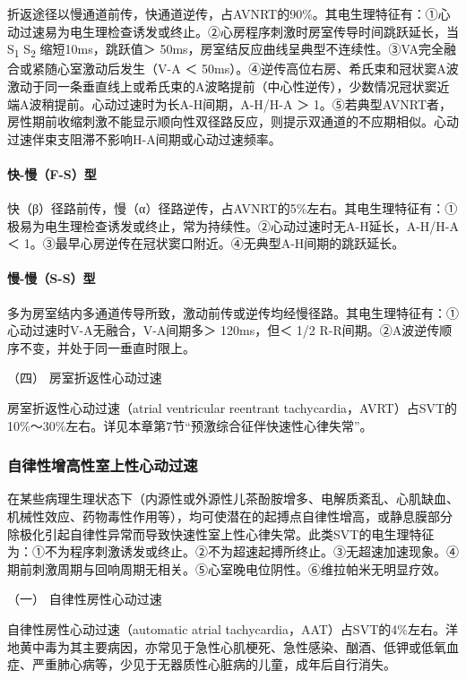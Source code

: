 折返途径以慢通道前传，快通道逆传，占AVNRT的90\%。其电生理特征有：①心动过速易为电生理检查诱发或终止。②心房程序刺激时房室传导时间跳跃延长，当S\textsubscript{1}
S\textsubscript{2} 缩短10ms，跳跃值＞
50ms，房室结反应曲线呈典型不连续性。③VA完全融合或紧随心室激动后发生（V-A
＜
50ms）。④逆传高位右房、希氏束和冠状窦A波激动于同一条垂直线上或希氏束的A波略提前（中心性逆传），少数情况冠状窦近端A波稍提前。心动过速时为长A-H间期，A-H/H-A
＞
1。⑤若典型AVNRT者，房性期前收缩刺激不能显示顺向性双径路反应，则提示双通道的不应期相似。心动过速伴束支阻滞不影响H-A间期或心动过速频率。

\paragraph{快-慢（F-S）型}

快（β）径路前传，慢（α）径路逆传，占AVNRT的5\%左右。其电生理特征有：①极易为电生理检查诱发或终止，常为持续性。②心动过速时无A-H延长，A-H/H-A
＜ 1。③最早心房逆传在冠状窦口附近。④无典型A-H间期的跳跃延长。

\paragraph{慢-慢（S-S）型}

多为房室结内多通道传导所致，激动前传或逆传均经慢径路。其电生理特征有：①心动过速时V-A无融合，V-A间期多＞
120ms，但＜ 1/2 R-R间期。②A波逆传顺序不变，并处于同一垂直时限上。

\hypertarget{text00289.htmlux5cux23CHP10-2-2-1-1-4}{}
（四） 房室折返性心动过速

房室折返性心动过速（atrial ventricular reentrant
tachycardia，AVRT）占SVT的10\%～30\%左右。详见本章第7节“预激综合征伴快速性心律失常”。

\subsubsection{自律性增高性室上性心动过速}

在某些病理生理状态下（内源性或外源性儿茶酚胺增多、电解质紊乱、心肌缺血、机械性效应、药物毒性作用等），均可使潜在的起搏点自律性增高，或静息膜部分除极化引起自律性异常而导致快速性室上性心律失常。此类SVT的电生理特征为：①不为程序刺激诱发或终止。②不为超速起搏所终止。③无超速加速现象。④期前刺激周期与回响周期无相关。⑤心室晚电位阴性。⑥维拉帕米无明显疗效。

\hypertarget{text00289.htmlux5cux23CHP10-2-2-1-2-1}{}
（一） 自律性房性心动过速

自律性房性心动过速（automatic atrial
tachycardia，AAT）占SVT的4\%左右。洋地黄中毒为其主要病因，亦常见于急性心肌梗死、急性感染、酗酒、低钾或低氧血症、严重肺心病等，少见于无器质性心脏病的儿童，成年后自行消失。

